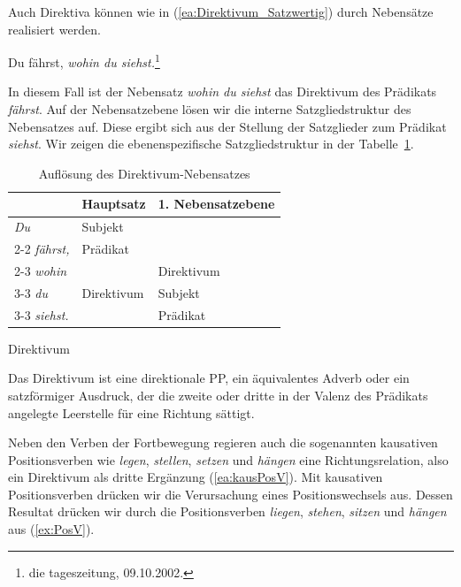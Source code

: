 Auch Direktiva können wie in (\ref{ea:Direktivum_Satzwertig}) durch Nebensätze realisiert werden. 

\ea\label{ea:Direktivum_Satzwertig} Du fährst, \textit{wohin du siehst.}\footnote{die tageszeitung, 09.10.2002.}
\z  

In diesem Fall ist der Nebensatz \textit{wohin du siehst} das Direktivum des Prädikats \textit{fährst}. Auf der Nebensatzebene lösen wir die interne Satzgliedstruktur des Nebensatzes auf. Diese ergibt sich aus der Stellung der Satzglieder zum Prädikat \textit{siehst}. Wir zeigen die ebenenspezifische Satzgliedstruktur in der Tabelle~\ref{tab:DirektivumNS}.

\begin{table}
  \centering
  \begin{tabular}{l|l|l}
     & Hauptsatz & 1. Nebensatzebene \\
    \hline
    \textit{Du} & Subjekt & \\ \cline{2-2}
    \textit{fährst,} & Prädikat & \\ \cline{2-3} 
     \textit{wohin} & \multirow{3}{*}{Direktivum} & Direktivum \\ \cline{3-3}
    \textit{du} &  & Subjekt \\ \cline{3-3} 
    \textit{siehst.} & & Prädikat \\ 
    \hline
  \end{tabular}
  \caption{Auflösung des Direktivum-Nebensatzes}
  \label{tab:DirektivumNS}
\end{table}
  
\begin{Definition}{Direktivum}
    
\noindent Das Direktivum ist eine direktionale PP, ein äquivalentes Adverb oder ein satzförmiger Ausdruck, der die zweite oder dritte in der Valenz des Prädikats angelegte Leerstelle für eine Richtung sättigt. 
\end{Definition}


Neben den Verben der Fortbewegung regieren auch die sogenannten kausativen Positionsverben wie \textit{legen}, \textit{stellen}, \textit{setzen} und \textit{hängen} eine Richtungsrelation, also ein Direktivum als dritte Ergänzung (\ref{ea:kausPosV}). Mit kausativen Positionsverben drücken wir die Verursachung eines Positionswechsels aus.  Dessen Resultat drücken wir durch die Positionsverben \textit{liegen}, \textit{stehen}, \textit{sitzen} und \textit{hängen} aus (\ref{ex:PosV}).

